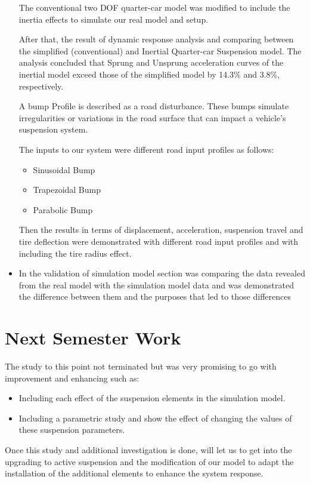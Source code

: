 \begin{itemize}
	The conventional two DOF quarter-car model was modified to include the inertia effects to simulate our real model and setup.
	
	After that, the result of dynamic response analysis and comparing between the simplified (conventional) and Inertial Quarter-car Suspension model. The analysis concluded that Sprung and Unsprung acceleration curves of the inertial model exceed those of the simplified model by 14.3\% and 3.8\%, respectively.
	
	A bump Profile is described as a road disturbance. These bumps simulate irregularities or variations in the road surface that can impact a vehicle's suspension system.
	
	The inputs to our system were different road input profiles as follows:
	\begin{itemize}
		\item Sinusoidal Bump
		\item Trapezoidal Bump
		\item Parabolic Bump
	\end{itemize}
	Then the results in terms of displacement, acceleration, suspension travel and tire deflection were demonstrated with different road input profiles and with including the tire radius effect.
	
	\item In the validation of simulation model section was comparing the data revealed from the real model with the simulation model data and was demonstrated the difference between them and the purposes that led to those differences
\end{itemize}

\section{Next Semester Work}
The study to this point not terminated but was very promising to go with improvement and enhancing such as:
\begin{itemize}
	\item Including each effect of the suspension elements in the simulation model.
	\item Including a parametric study and show the effect of changing the values of these suspension parameters.
\end{itemize}
Once this study and additional investigation is done, will let us to get into the upgrading to active suspension and the modification of our model to adapt the installation of the additional elements to enhance the system response.

\newpage

\fi